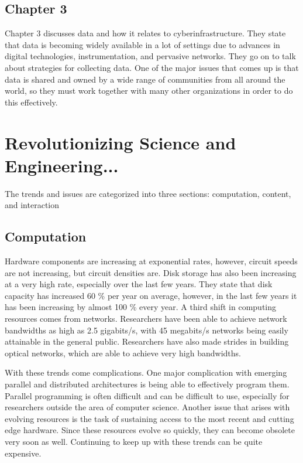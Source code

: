 \documentclass[11pt]{article}
\begin{document}
\subsection{Chapter 3}
Chapter 3 discusses data and how it relates to cyberinfrastructure.  They state that data is becoming widely available in a lot of settings due to advances in digital technologies, instrumentation, and pervasive networks.  They go on to talk about strategies for collecting data.  One of the major issues that comes up is that data is shared and owned by a wide range of communities from all around the world, so they must work together with many other organizations in order to do this effectively.  

\newpage
\section{Revolutionizing Science and Engineering...}
The trends and issues are categorized into three sections: computation, content, and interaction
\subsection{Computation}
Hardware components are increasing at exponential rates, however, circuit speeds are not increasing, but circuit densities are.  Disk storage has also been increasing at a very high rate, especially over the last few years.  They state that disk capacity has increased 60 \% per year on average, however, in the last few years it has been increasing by almost 100 \% every year.  A third shift in computing resources comes from networks.  Researchers have been able to achieve network bandwidths as high as 2.5 gigabits/s, with 45 megabits/s networks being easily attainable in the general public.  Researchers have also made strides in building optical networks, which are able to achieve very high bandwidths.

With these trends come complications.  One major complication with emerging parallel and distributed architectures is being able to effectively program them.  Parallel programming is often difficult and can be difficult to use, especially for researchers outside the area of computer science.  Another issue that arises with evolving resources is the task of sustaining access to the most recent and cutting edge hardware.  Since these resources evolve so quickly, they can become obsolete very soon as well.  Continuing to keep up with these trends can be quite expensive.  
\end{document}

